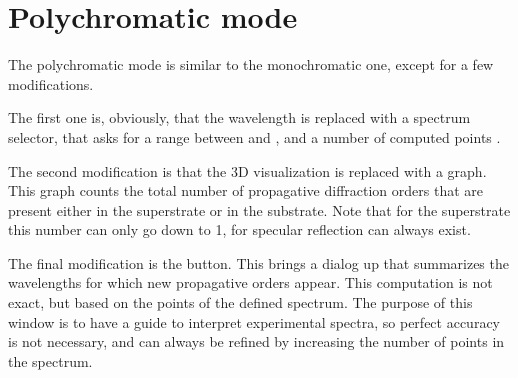 \section{Polychromatic mode}

The polychromatic mode is similar to the monochromatic one, except for a few modifications.

The first one is, obviously, that the wavelength is replaced with a spectrum selector, that asks for a range between  and , and a number of computed points .

The second modification is that the 3D visualization is replaced with a graph. This graph counts the total number of propagative diffraction orders that are present either in the superstrate or in the substrate. Note that for the superstrate this number can only go down to 1, for specular reflection can always exist.

The final modification is the  button. This brings a dialog up that summarizes the wavelengths for which new propagative orders appear. This computation is not exact, but based on the points of the defined spectrum. The purpose of this window is to have a guide to interpret experimental spectra, so perfect accuracy is not necessary, and can always be refined by increasing the number of points in the spectrum.